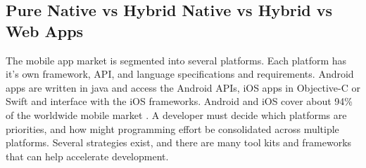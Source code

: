 \subsection{Pure Native vs Hybrid Native vs Hybrid vs Web Apps}

The mobile app market is segmented into several platforms. Each platform has it’s own framework, API, and language specifications and requirements. Android apps are written in java and access the Android APIs, iOS apps in Objective-C or Swift and interface with the iOS frameworks. Android and iOS cover about 94\% of the worldwide mobile market \cite{mobile_market}. A developer must decide which platforms are priorities, and how might programming effort be consolidated across multiple platforms. Several strategies exist, and there are many tool kits and frameworks that can help accelerate development.


